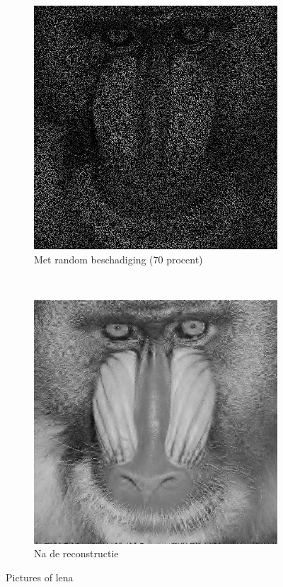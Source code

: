\begin{figure}
    \centering
    \begin{subfigure}[b]{0.45\textwidth}
        \includegraphics[width=\textwidth]{../src/inpainting/baboon_broke_random}
        \caption{Met random beschadiging (70 procent)}
        \label{fig:tiger}
    \end{subfigure}
    ~ %
    \begin{subfigure}[b]{0.45\textwidth}
        \includegraphics[width=\textwidth]{../src/inpainting/baboon_fixed_random}
        \caption{Na de reconstructie}
        \label{fig:mouse}
    \end{subfigure}
    \caption{Pictures of lena}\label{fig:baboon}
\end{figure}


